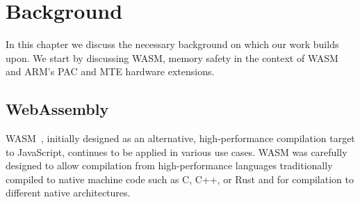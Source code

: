 \chapter{Background}
\label{ch:background}

In this chapter we discuss the necessary background on which our work builds upon.
We start by discussing \ac{WASM}, memory safety in the context of \ac{WASM} and ARM's \ac{PAC} and \ac{MTE} hardware extensions.

\section{WebAssembly}
\label{sec:wasm}

\Acl{WASM}~\cite{haas2017bringing}, initially designed as an alternative, high-performance compilation target to JavaScript, continues to be applied in various use cases.
\Ac{WASM} was carefully designed to allow compilation from high-performance languages traditionally compiled to native machine code such as C, C++, or Rust and for compilation to different native architectures.
